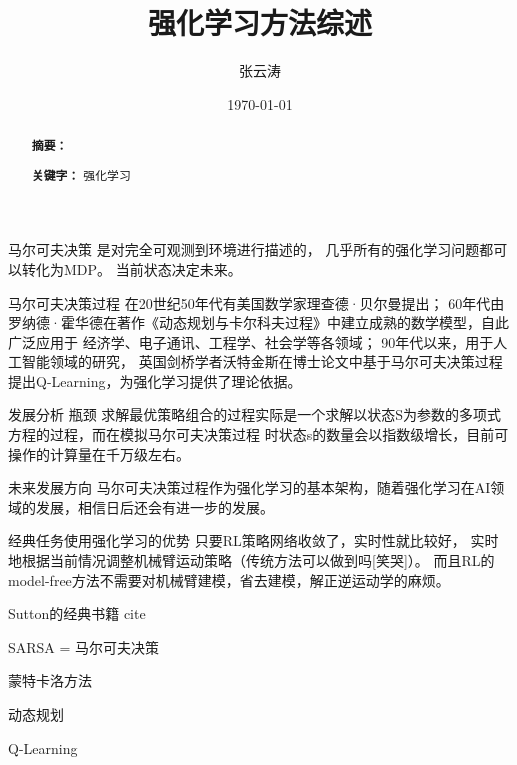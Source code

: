 \documentclass{article}
\begin{document}
\title{强化学习方法综述}
\author{张云涛}
\date{\today}
\maketitle

\begin{abstract}
\textbf{摘要：} 

\textbf{关键字：} 强化学习 
\end{abstract}


马尔可夫决策
是对完全可观测到环境进行描述的，
几乎所有的强化学习问题都可以转化为MDP。
当前状态决定未来。

马尔可夫决策过程
在20世纪50年代有美国数学家理查德·贝尔曼提出；
60年代由罗纳德·霍华德在著作《动态规划与卡尔科夫过程》中建立成熟的数学模型，自此广泛应用于
经济学、电子通讯、工程学、社会学等各领域；
90年代以来，用于人工智能领域的研究，
英国剑桥学者沃特金斯在博士论文中基于马尔可夫决策过程提出Q-Learning，为强化学习提供了理论依据。


发展分析
瓶颈
求解最优策略组合的过程实际是一个求解以状态S为参数的多项式方程的过程，而在模拟马尔可夫决策过程
时状态s的数量会以指数级增长，目前可操作的计算量在千万级左右。

未来发展方向
马尔可夫决策过程作为强化学习的基本架构，随着强化学习在AI领域的发展，相信日后还会有进一步的发展。



经典任务使用强化学习的优势
只要RL策略网络收敛了，实时性就比较好，
实时地根据当前情况调整机械臂运动策略（传统方法可以做到吗[笑哭]）。
而且RL的model-free方法不需要对机械臂建模，省去建模，解正逆运动学的麻烦。





Sutton的经典书籍 cite

SARSA = 
马尔可夫决策

蒙特卡洛方法

动态规划

Q-Learning
\end{document}
